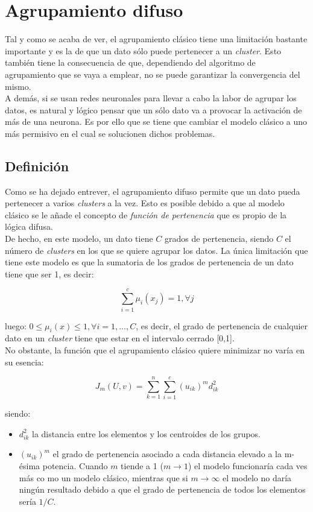 \documentclass[]{report}
\begin{document}
	\chapter{Agrupamiento difuso}
		Tal y como se acaba de ver, el agrupamiento clásico tiene una limitación bastante importante y es la de que un dato sólo puede pertenecer a un \textit{cluster}. Esto también tiene la consecuencia de que, dependiendo del algoritmo de agrupamiento que se vaya a emplear, no se puede garantizar la convergencia del mismo.\\
		
		A demás, si se usan redes neuronales para llevar a cabo la labor de agrupar los datos, es natural y lógico pensar que un sólo dato va a provocar la activación de más de una neurona. Es por ello que se tiene que cambiar el modelo clásico a uno más permisivo en el cual se solucionen dichos problemas.
			
		\section{Definición}
			Como se ha dejado entrever, el agrupamiento difuso permite que un dato pueda pertenecer a varios \textit{clusters} a la vez. Esto es posible debido a que al modelo clásico se le añade el concepto de \textit{función de pertenencia} que es propio de la lógica difusa.\\
			
			De hecho, en este modelo, un dato tiene $C$ grados de pertenencia, siendo $C$ el número de \textit{clusters} en los que se quiere agrupar los datos. La única limitación que tiene este modelo es que la sumatoria de los grados de pertenencia de un dato tiene que ser 1, es decir:
			
			$$\sum_{i=1}^c\mu_i(x_j) = 1, \forall j$$
			
			luego: $0 \leq \mu_i(x) \leq 1, \forall i=1,...,C$, es decir, el grado de pertenencia de cualquier dato en un \textit{cluster} tiene que estar en el intervalo cerrado [0,1].\\
			
			No obstante, la función que el agrupamiento clásico quiere minimizar no varía en su esencia:
			
			$$J_m(U,v) = \sum_{k=1}^n \sum_{i=1}^c (u_{ik})^m d^2_{ik}$$

			siendo:
			\begin{itemize}
				\item $d^2_{ik}$ la distancia entre los elementos y los centroides de los grupos.
				\item $(u_{ik})^m$ el grado de pertenencia asociado a cada distancia elevado a la m-ésima potencia. Cuando $m$ tiende a 1 ($m \rightarrow 1$) el modelo funcionaría cada ves más co mo un modelo clásico, mientras que si $m \rightarrow \infty$ el modelo no daría ningún resultado debido a que el grado de pertenencia de todos los elementos sería $1/C$.
			\end{itemize}
		
\end{document}

